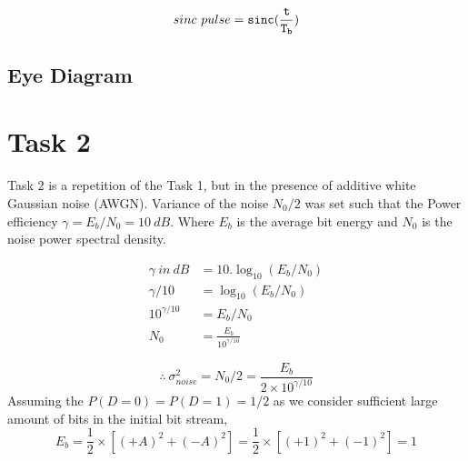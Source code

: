 \documentclass[a4paper,11pt]{article}%
\begin{document}
\[
sinc~pulse = {\tt sinc(\frac{t}{T_b})}
\]


\subsection{Eye Diagram}

\section{Task 2}
Task 2 is a repetition of the Task 1, but in the presence of additive white Gaussian noise (AWGN). Variance of the noise $N_0/2$ was set such that the Power efficiency $\gamma = E_b/N_0 = 10 ~dB$. Where $E_b$ is the average bit energy and $N_0$ is the noise power spectral density.

\[
\begin{split}
	\gamma~in~dB &= 10.\log_{10}(E_b/N_0)\\
	\gamma/10 &= \log_{10}(E_b/N_0)\\
	10^{\gamma/10} &= E_b/N_0\\
	N_0 &= \frac{E_b}{10^{\gamma/10}}
\end{split}
\]

\[\therefore ~\sigma_{noise}^2 = N_0/2 = \frac{E_b}{2 \times 10^{\gamma/10}}  \]
Assuming the $P(D = 0) = P(D = 1) = 1/2$ as we consider sufficient large amount of bits in the initial bit stream,
\[
E_b = \frac{1}{2} \times \left[ (+A)^2 + (-A)^2 \right]
 = \frac{1}{2} \times \left[ (+1)^2 + (-1)^2 \right]
 = 1
\]
\end{document}
